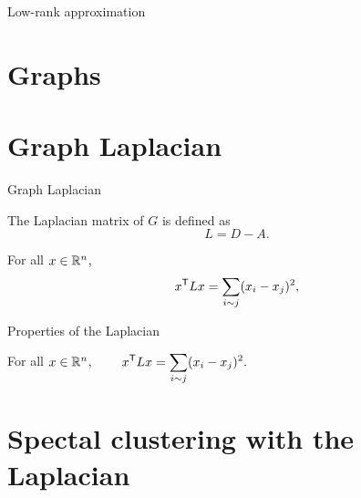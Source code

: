 \documentclass{beamer}
\begin{document}
\begin{frame}[t]{Low-rank approximation}
	\grid

\end{frame}

\section{Graphs}

\section{Graph Laplacian}

\begin{frame}[t]{Graph Laplacian}
	\grid

	\vspace{-0.4cm}
	\begin{definition}
		The Laplacian matrix of $G$ is defined as
		$$
		L = D - A.
		$$
	\end{definition}

	\pause
	\vspace{-0.4cm}
	\begin{exampleblock}{}
		For all $x \in \mathbb{R}^n$,
		$$
		x^{\sT} L x = \sum_{i \sim j} (x_i - x_j)^2, 
		\vspace{-0.2cm}
		$$
	\end{exampleblock}
\end{frame}


\begin{frame}[t]{Properties of the Laplacian}
	\grid

	\vspace{-0.8cm}
	\begin{exampleblock}{}
		For all $x \in \mathbb{R}^n$,
		$\displaystyle \qquad
		x^{{\sf T}} L x = \sum_{i \sim j} (x_i - x_j)^2.
		$
	\end{exampleblock}


	\pause
	\pause
\end{frame}

\section{Spectal clustering with the Laplacian}
\end{document}
